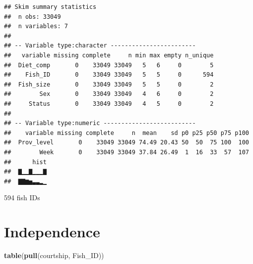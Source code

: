 \documentclass[]{book}
\newenvironment{Shaded}{\begin{snugshade}}{\end{snugshade}}
\newcommand{\KeywordTok}[1]{\textcolor[rgb]{0.13,0.29,0.53}{\textbf{#1}}}
\newcommand{\NormalTok}[1]{#1}
\begin{document}
\begin{verbatim}
## Skim summary statistics
##  n obs: 33049 
##  n variables: 7 
## 
## -- Variable type:character ------------------------
##   variable missing complete     n min max empty n_unique
##  Diet_comp       0    33049 33049   5   6     0        5
##    Fish_ID       0    33049 33049   5   5     0      594
##  Fish_size       0    33049 33049   5   5     0        2
##        Sex       0    33049 33049   4   6     0        2
##     Status       0    33049 33049   4   5     0        2
## 
## -- Variable type:numeric --------------------------
##    variable missing complete     n  mean    sd p0 p25 p50 p75 p100
##  Prov_level       0    33049 33049 74.49 20.43 50  50  75 100  100
##        Week       0    33049 33049 37.84 26.49  1  16  33  57  107
##      hist
##  ▇▁▁▇▁▁▁▇
##  ▇▇▆▅▃▃▂▁
\end{verbatim}

594 fish IDs

\hypertarget{independence}{%
\section{Independence}\label{independence}}

\begin{Shaded}
\begin{Highlighting}[]
\KeywordTok{table}\NormalTok{(}\KeywordTok{pull}\NormalTok{(courtship, Fish_ID))}
\end{Highlighting}
\end{Shaded}
\end{document}
